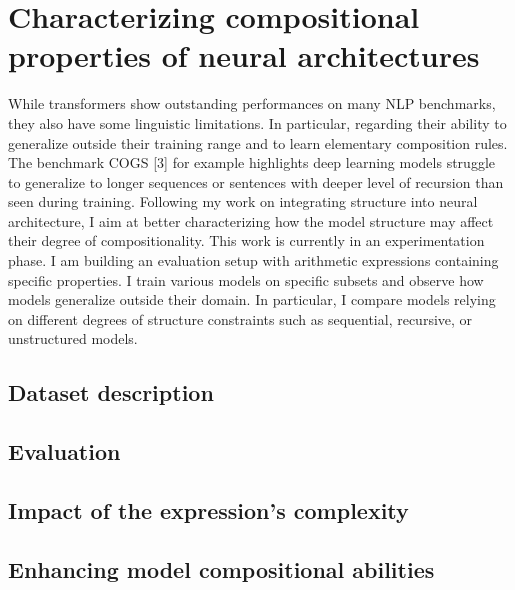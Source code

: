 \setchapterpreamble[u]{\margintoc}
\chapter{Characterizing compositional properties of neural architectures}

While transformers show outstanding performances on many NLP benchmarks, they also have some linguistic limitations. In particular, regarding their ability to generalize outside their training range and to learn elementary composition rules. The benchmark COGS [3] for example highlights deep learning models struggle to generalize to longer sequences or sentences with deeper level of recursion than seen during training. Following my work on integrating structure into neural architecture, I aim at better characterizing how the model structure may affect their degree of compositionality. This work is currently in an experimentation phase. I am building an evaluation setup with arithmetic expressions containing specific properties. I train various models on specific subsets and observe how models generalize outside their domain. In particular, I compare models relying on different degrees of structure constraints such as sequential, recursive, or unstructured models.


\section{Dataset description}

\section{Evaluation}

\section{Impact of the expression’s complexity}

\section{Enhancing model compositional abilities}


